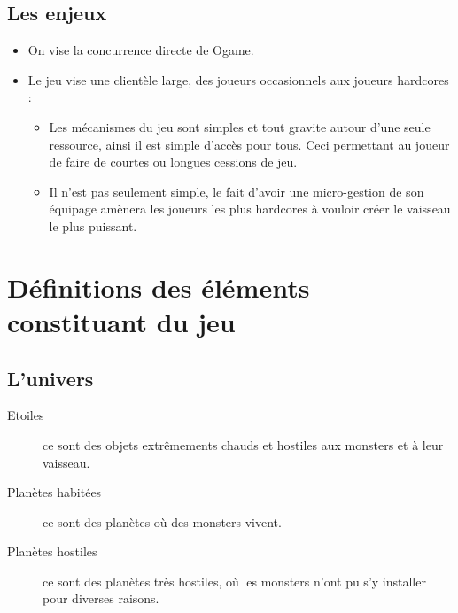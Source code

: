 \documentclass[a4paper,11pt]{report}
\begin{document}
    \section{Les enjeux}
    \begin{itemize}
      \item On vise la concurrence directe de Ogame.
      \item Le jeu vise une clientèle large, des joueurs occasionnels aux joueurs hardcores :
      \begin{itemize}
        \item Les mécanismes du jeu sont simples et tout gravite autour d'une seule ressource, ainsi il est simple d'accès pour tous. Ceci permettant au joueur de faire de courtes ou longues cessions de jeu.
        \item Il n'est pas seulement simple, le fait d'avoir une micro-gestion de son équipage amènera les joueurs les plus hardcores à vouloir créer le vaisseau le plus puissant.
      \end{itemize}
    \end{itemize}

\chapter{Définitions des éléments constituant du jeu}
    \section{L'univers}
      \begin{description}
        \item[Etoiles] ce sont des objets extrêmements chauds et hostiles aux monsters et à leur vaisseau.
        \item[Planètes habitées] ce sont des planètes où des monsters vivent.
        \item[Planètes hostiles] ce sont des planètes très hostiles, où les monsters n'ont pu s'y installer pour diverses raisons.
      \end{description}
      
\end{document}
